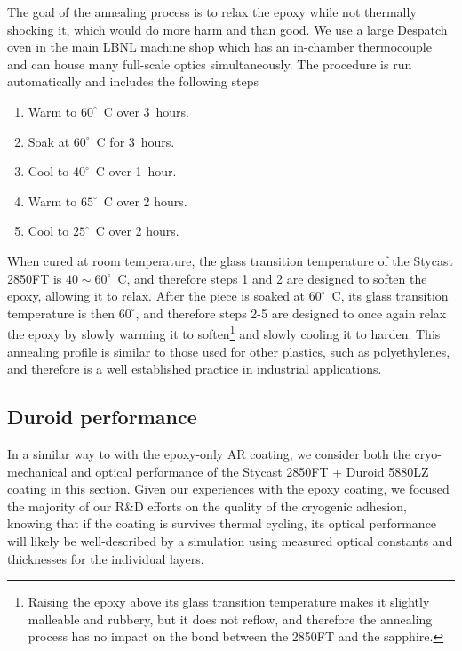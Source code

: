 The goal of the annealing process is to relax the epoxy while not thermally shocking it, which would do more harm and than good. We use a large Despatch oven in the main LBNL machine shop which has an in-chamber thermocouple and can house many full-scale optics simultaneously. The procedure is run automatically and includes the following steps
\begin{enumerate}
    \item Warm to $60^{\circ}$~C over 3~hours.
    \item Soak at $60^{\circ}$~C for 3~hours.
    \item Cool to $40^{\circ}$~C over 1~hour.
    \item Warm to $65^{\circ}$~C over 2 hours.
    \item Cool to $25^{\circ}$~C over 2 hours.
\end{enumerate}
When cured at room temperature, the glass transition temperature of the Stycast 2850FT is $40 \sim 60^{\circ}$~C, and therefore steps 1 and 2 are designed to soften the epoxy, allowing it to relax. After the piece is soaked at $60^{\circ}$~C, its glass transition temperature is then $60^{\circ}$, and therefore steps 2-5 are designed to once again relax the epoxy by slowly warming it to soften\footnote{Raising the epoxy above its glass transition temperature makes it slightly malleable and rubbery, but it does not reflow, and therefore the annealing process has no impact on the bond between the 2850FT and the sapphire.} and slowly cooling it to harden. This annealing profile is similar to those used for other plastics, such as polyethylenes, and therefore is a well established practice in industrial applications.


\subsection{Duroid performance}
\label{sec:sapphire_ar_coating_epoxy_plastic_duroid_performance}

In a similar way to with the epoxy-only AR coating, we consider both the cryo-mechanical and optical performance of the Stycast 2850FT + Duroid 5880LZ coating in this section. Given our experiences with the epoxy coating, we focused the majority of our R\&D efforts on the quality of the cryogenic adhesion, knowing that if the coating is survives thermal cycling, its optical performance will likely be well-described by a simulation using measured optical constants and thicknesses for the individual layers. 


